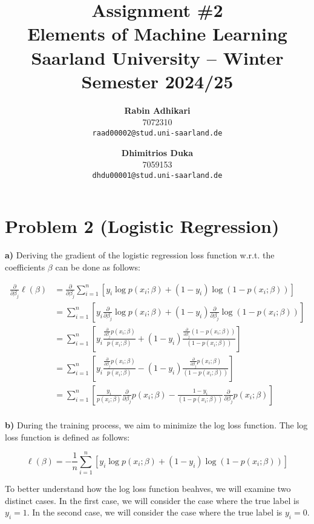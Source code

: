 \documentclass{article}
\title{Assignment \#2\\
  \vspace{2mm}
  \small{Elements of Machine Learning}
  \\
  \vspace{2mm}
  \small{Saarland University -- Winter Semester 2024/25}
}
\author{%
\textbf{Rabin Adhikari} \\
  7072310 \\
  \texttt{raad00002@stud.uni-saarland.de} \\
  \and
  \textbf{Dhimitrios Duka} \\
 7059153 \\
  \texttt{dhdu00001@stud.uni-saarland.de} \\
}
\begin{document}
\maketitle

\section*{Problem 2 (Logistic Regression)}
\textbf{a)} Deriving the gradient of the logistic regression loss function w.r.t. the coefficients $\beta$ can be done as follows:

\begin{equation}
  \begin{aligned}
    \frac{\partial}{\partial \beta_j}\ell(\beta) &= \frac{\partial}{\partial \beta_j}\sum_{i=1}^{n} \left[ y_i \log p(x_i; \beta) + (1 - y_i) \log \left(1 - p(x_i; \beta) \right) \right] \\
    &= \sum_{i=1}^{n} \left[ y_i \frac{\partial}{\partial \beta_j} \log p(x_i; \beta) + (1 - y_i) \frac{\partial}{\partial \beta_j} \log \left(1 - p(x_i; \beta) \right) \right] \\
    &= \sum_{i=1}^{n} \left[ y_i \frac{\frac{\partial}{\partial \beta_j} p(x_i; \beta)}{p(x_i; \beta)} + (1 - y_i) \frac{\frac{\partial}{\partial \beta_j}(1 - p(x_i; \beta))}{(1 - p(x_i; \beta))} \right] \\
    &= \sum_{i=1}^{n} \left[ y_i \frac{\frac{\partial}{\partial \beta_j} p(x_i; \beta)}{p(x_i; \beta)} - (1 - y_i) \frac{\frac{\partial}{\partial \beta_j}p(x_i; \beta)}{(1 - p(x_i; \beta))} \right] \\
    &= \sum_{i=1}^{n} \left[  \frac{y_i}{p(x_i; \beta)}\frac{\partial}{\partial \beta_j} p(x_i; \beta) -  \frac{1 - y_i}{(1 - p(x_i; \beta))}\frac{\partial}{\partial \beta_j}p(x_i; \beta) \right] \\
  \end{aligned}
\end{equation}

\textbf{b)}
During the training process, we aim to minimize the log loss function. The log loss function is defined as follows:

\begin{equation}
  \ell(\beta) = -\frac{1}{n} \sum_{i=1}^{n} \left[ y_i \log p(x_i; \beta) + (1 - y_i) \log \left(1 - p(x_i; \beta) \right) \right]
\end{equation}

To better understand how the log loss function beahves, we will examine two distinct cases. In the first case, we will consider the case where the true label is $y_i = 1$. In the second case, we will consider the case where the true label is $y_i = 0$.
\end{document}
